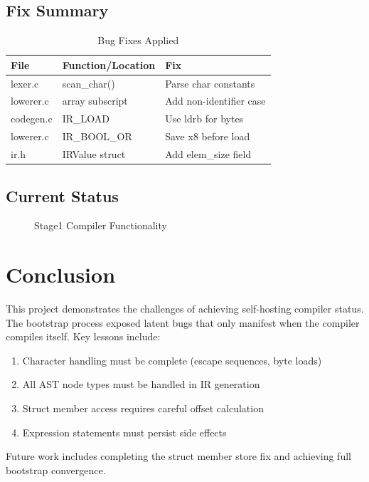 \documentclass{article}
\begin{document}
\subsection{Fix Summary}

\begin{table}[h]
\centering
\begin{tabular}{lll}
\toprule
\textbf{File} & \textbf{Function/Location} & \textbf{Fix} \\
\midrule
lexer.c & scan\_char() & Parse char constants \\
lowerer.c & array subscript & Add non-identifier case \\
codegen.c & IR\_LOAD & Use ldrb for bytes \\
lowerer.c & IR\_BOOL\_OR & Save x8 before load \\
ir.h & IRValue struct & Add elem\_size field \\
\bottomrule
\end{tabular}
\caption{Bug Fixes Applied}
\end{table}

\subsection{Current Status}

\begin{figure}[h]
\centering
{}
\caption{Stage1 Compiler Functionality}
\end{figure}

\section{Conclusion}

This project demonstrates the challenges of achieving self-hosting compiler status. The bootstrap process exposed latent bugs that only manifest when the compiler compiles itself. Key lessons include:

\begin{enumerate}
    \item Character handling must be complete (escape sequences, byte loads)
    \item All AST node types must be handled in IR generation
    \item Struct member access requires careful offset calculation
    \item Expression statements must persist side effects
\end{enumerate}

Future work includes completing the struct member store fix and achieving full bootstrap convergence.
\end{document}
